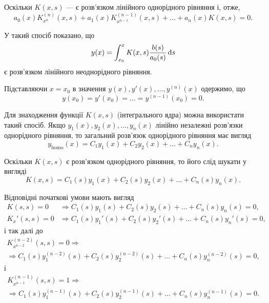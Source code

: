 Оскільки $K(x, s)$ --- є розв'язком лінійного однорідного рівняння і, отже,
\begin{equation*}
	a_0(x) K_{x^n}^{(n)}(x, s) + a_1(x) K_{x^{n - 1}}^{(n - 1)}(x, s) + \ldots + a_n(x) K(x, s) = 0.
\end{equation*}
 
У такий спосіб показано, що
\begin{equation*}
    y(x) = \int_{x_0}^x K(x, s) \frac{b(s)}{a_0(s)} \mathop{}\!\mathrm{d} s
\end{equation*}
є розв'язком лінійного неоднорідного рівняння. \parvskip

Підставляючи $x = x_0$ в значення $y(x), y'(x), \ldots, y^{(n)}(x)$ одержимо, що
\begin{equation*}
	y(x_0) = y'(x_0) = \ldots = y^{(n - 1)}(x_0) = 0.
\end{equation*}

Для знаходження функції $K(x, s)$ (інтегрального ядра) можна використати такий спосіб. Якщо $y_1(x), y_2(x), \ldots, y_n(x)$ лінійно незалежні роз\-в'яз\-ки однорідного рівняння, то загальний роз\-в'яз\-ок однорідного рівняння має вигляд 
\begin{equation*}
	y_{\text{homo}}(x) = C_1 y_1(x) + C_2 y_2(x) + \ldots + C_n y_n(x).
\end{equation*}

Оскільки $K(x, s)$ є розв'язком однорідного рівняння, то його слід шукати у вигляді
\begin{equation*}
	K(x, s) = C_1(s) y_1(x) + C_2(s) y_2(x) + \ldots + C_n(s) y_n(x).
\end{equation*}

Відповідні початкові умови мають вигляд
\begin{align*}
	K(s, s) = 0 &\Rightarrow C_1(s) y_1(s) + C_2(s) y_2(s) + \ldots + C_n(s) y_n(s) = 0, \\
	K_x'(s, s) = 0 &\Rightarrow C_1(s) y_1'(s) + C_2(s) y_2'(s) + \ldots + C_n(s) y_n'(s) = 0,
\end{align*}
і так далі до
\begin{multline*}
	K_{x^{n - 2}}^{(n - 2)}(s, s) = 0 \Rightarrow \\ \Rightarrow C_1(s) y_1^{(n - 2)}(s) + C_2(s) y_2^{(n - 2)}(s) + \ldots + C_n(s) y_n^{(n - 2)}(s) = 0,
\end{multline*}
і
\begin{multline*}
	K_{x^{n - 1}}^{(n - 1)}(s, s) = 1 \Rightarrow \\ \Rightarrow C_1(s) y_1^{(n - 1)}(s) + C_2(s) y_2^{(n - 1)}(s) + \ldots + C_n(s) y_n^{(n - 1)}(s) = 0. 
\end{multline*}

